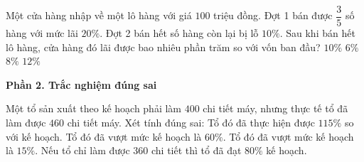 \begin{ex} %
Một cửa hàng nhập về một lô hàng với giá $100$ triệu đồng. Đợt 1 bán được $\dfrac{3}{5}$ số hàng với mức lãi $20\%$. Đợt 2 bán hết số hàng còn lại bị lỗ $10\%$. Sau khi bán hết lô hàng, cửa hàng đó lãi được bao nhiêu phần trăm so với vốn ban đầu?
\choice
{$10\%$}
{$6\%$}
{\True $8\%$}
{$12\%$}
\end{ex}

\textbf{Phần 2. Trắc nghiệm đúng sai}

\begin{ex} %
Một tổ sản xuất theo kế hoạch phải làm $400$ chi tiết máy, nhưng thực tế tổ đã làm được $460$ chi tiết máy. Xét tính đúng sai:
\choiceTF
{\True Tổ đó đã thực hiện được $115\%$ so với kế hoạch.}
{Tổ đó đã vượt mức kế hoạch là $60\%$.}
{\True Tổ đó đã vượt mức kế hoạch là $15\%$.}
{Nếu tổ chỉ làm được $360$ chi tiết thì tổ đã đạt $80\%$ kế hoạch.}
\end{ex}

